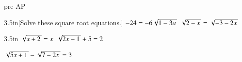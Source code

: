 \begin{taggedblock}{pre-AP}


    
\begin{my2Problems}[\large]{3.5in}[Solve these square root equations.]
    {
        $ -24 = -6 \myRoot{ 1 - 3a } $
    }
    {
        $ \myRoot{2-x} = \myRoot{-3-2x}  $
    }
\end{my2Problems}

\begin{my2Problems}[\large]{3.5in}
    {
        $ \myRoot{x+2} = x $
    }
    {
        $ \myRoot{2x-1} + 5 = 2 $
    }
\end{my2Problems}

\begin{myWideProblem}[\large]{8in}
    {
        $ \myRoot{5x+1}  -  \myRoot{7-2x} = 3 $
    }
\end{myWideProblem}


\end{taggedblock}